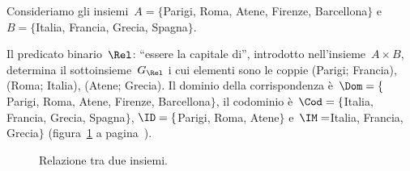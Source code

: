 \begin{exrig}
\begin{esempio}
Consideriamo gli insiemi~$A= \{$Parigi, Roma, Atene, Firenze, Barcellona$\}$ e~$B= \{$Italia, Francia, Grecia, Spagna$\}$.

Il predicato binario~$\Rel$: ``essere la capitale di'', introdotto nell'insieme~$A \times B$, determina il sottoinsieme~$G_\Rel$ i cui elementi sono le coppie (Parigi; Francia),
(Roma; Italia), (Atene; Grecia). Il dominio della corrispondenza è~$\Dom= \{$Parigi, Roma, Atene, Firenze, Barcellona$\}$, il codominio è~$\Cod= \{$Italia, Francia, Grecia, Spagna$\}$, $\ID=\{$Parigi, Roma, Atene$\}$ e~$\IM=$Italia, Francia, Grecia$\}$ (figura~\ref{fig:7.5} a pagina~\pageref{fig:7.5}).
\end{esempio}
\end{exrig}
\begin{figure}[htb]
 \centering
 \caption{Relazione tra due insiemi.}\label{fig:7.5}
\end{figure}

